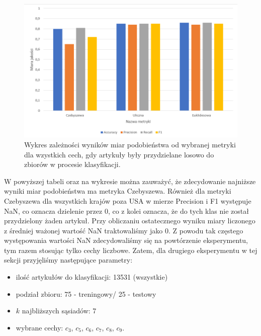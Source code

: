 \documentclass{classrep}
\begin{document}
\begin{figure}[H]
    \centering
    \includegraphics[width=14cm]{wykres_metryki1.png}
    \caption{Wykres zależności wyników miar podobieństwa od wybranej metryki dla wzystkich cech, gdy artykuły były przydzielane losowo do zbiorów w procesie klasyfikacji.}
        \label{wykres:metryka_wszystkie}
\end{figure}

W powyższej tabeli oraz na wykresie można zauważyć, że zdecydowanie najniższe wyniki miar podobieństwa ma metryka Czebyszewa. Również dla metryki Czebyszewa dla wszystkich krajów poza USA w mierze Precision i F1 występuje NaN, co oznacza dzielenie przez 0, co z kolei oznacza, że do tych klas nie został przydzielony żaden artykuł. Przy obliczaniu ostatecznego wyniku miary liczonego z średniej ważonej wartość NaN traktowaliśmy jako 0. Z powodu tak częstego występowania wartości NaN zdecydowaliśmy się na powtórzenie eksperymentu, tym razem stosując tylko cechy liczbowe.
Zatem, dla drugiego eksperymentu w tej sekcji przyjęliśmy następujące parametry:
\begin{itemize}
    \item ilość artykułów do klasyfikacji: 13531 (wszystkie)
    \item podział zbioru: 75 - treningowy/ 25 - testowy
    \item $k$ najbliższych sąsiadów: 7
    \item wybrane cechy: $c_3$, $c_5$, $c_6$, $c_7$, $c_8$, $c_9$.
\end{itemize}

\end{document}
